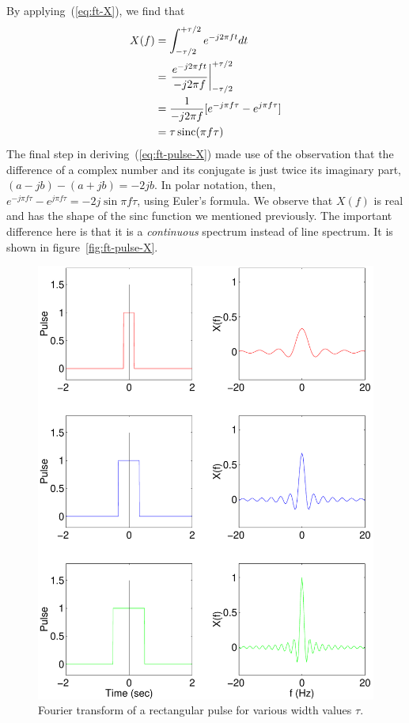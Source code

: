 By applying~(\ref{eq:ft-X}), we find that
\begin{align}
X(f) &= \int_{-\tau/2}^{+\tau/2} e^{-j2\pi ft}dt \notag\\ 
     &= \left.\frac{e^{-j2\pi ft}}
                      {-j2\pi f}\right|_{-\tau/2}^{+\tau/2} \notag\\ 
     &= \frac{1}{-j2\pi f}[e^{-j\pi f\tau}-e^{j\pi f\tau}] \notag\\
     &= \tau\operatorname{sinc}(\pi f \tau)
\label{eq:ft-pulse-X}
\end{align}
The final step in deriving~(\ref{eq:ft-pulse-X}) made use of the
observation that the difference of a complex number and its conjugate
is just twice its imaginary part, $(a-jb) - (a+jb) = -2jb$. In polar
notation, then, $e^{-j\pi f \tau} - e^{j\pi f \tau} = -2j\sin\pi f
\tau$, using Euler's formula. We observe that $X(f)$ is real and has
the shape of the sinc function we mentioned previously. The important
difference here is that it is a \emph{continuous} spectrum instead of
line spectrum.  It is shown in figure~\ref{fig:ft-pulse-X}.

\begin{figure}
\centerline{\includegraphics[width=5in]{ch-fft/ft_pulse_xX}}
\caption[Fourier transform of a rectangular pulse for various width 
values]{Fourier transform of a rectangular pulse for various width
values $\tau$.\label{fig:ft-pulse-xX}}
\end{figure}

